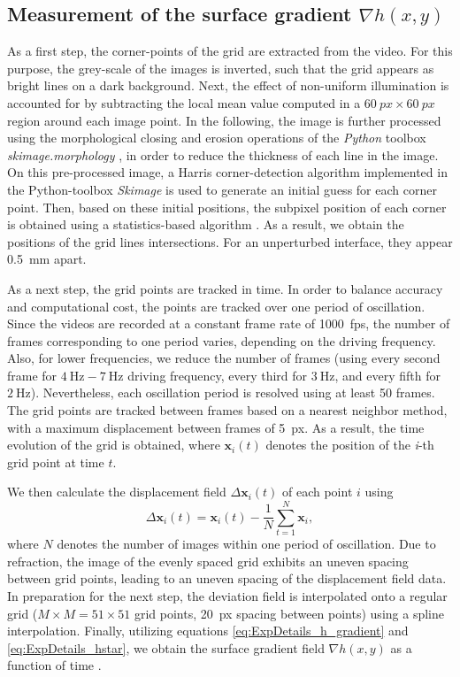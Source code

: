\documentclass{jfm_arxiv}
\renewcommand\vec{\mathbf}
\begin{document}
\subsection{Measurement of the surface gradient $\nabla h(x,y)$}
As a first step, the corner-points of the grid are extracted from the video. For this purpose, the grey-scale of the images is inverted, such that the grid appears as bright lines on a dark background. Next, the effect of non-uniform illumination is accounted for by subtracting the local mean value computed in a $\SI{60}{px} \times \SI{60}{px}$ region around each image point.
In the following, the image is further processed using the morphological closing and erosion operations of the \textit{Python} toolbox \textit{skimage.morphology} \citep{van2014scikit}, in order to reduce the thickness of each line in the image.
On this pre-processed image, a Harris corner-detection algorithm implemented in the Python-toolbox \textit{Skimage} is used to generate an initial guess for each corner point. Then, based on these initial positions, the subpixel position of each corner is obtained using a statistics-based algorithm \citep{forstner1987}.
As a result, we obtain the positions of the grid lines intersections. For an unperturbed interface, they appear \SI{0.5}{\milli \meter} apart.

As a next step, the grid points are tracked in time. In order to balance accuracy and computational cost, the points are tracked over one period of oscillation. Since the videos are recorded at a constant frame rate of \SI{1000}{fps}, the number of frames corresponding to one period varies, depending on the driving frequency. Also, for lower frequencies, we reduce the number of frames (using every second frame for $\SI{4}{\hertz}-\SI{7}{\hertz}$ driving frequency, every third for $\SI{3}{\hertz}$, and every fifth for $\SI{2}{\hertz}$). Nevertheless, each oscillation period is resolved using at least 50 frames. The grid points are tracked between frames based on a nearest neighbor method, with a maximum displacement between frames of \SI{5}{px}. As a result, the time evolution of the grid is obtained, where $\vec{x}_i(t)$ denotes the position of the \textit{i}-th grid point at time $t$. 

We then calculate the displacement field $\Delta \vec{x}_i\left( t \right)$ of each point $i$ using
\begin{equation}
\Delta \vec{x}_i\left( t \right) = \vec{x}_i\left( t \right) - \frac{1}{N} \sum_{t =1}^N \vec{x}_i, 
\end{equation}
where $N$ denotes the number of images within one period of oscillation.
Due to refraction, the image of the evenly spaced grid exhibits an uneven spacing between grid points, leading to an uneven spacing of the displacement field data. In preparation for the next step, the deviation field is interpolated onto a regular grid ($M\times M = 51 \times 51$ grid points, \SI{20}{px} spacing between points) using a spline interpolation. Finally, utilizing equations \eqref{eq:ExpDetails_h_gradient} and \eqref{eq:ExpDetails_hstar}, we obtain the surface gradient field $\nabla {h}(x,y)$ as a function of time \citep{Moisy2009}.
\end{document}
